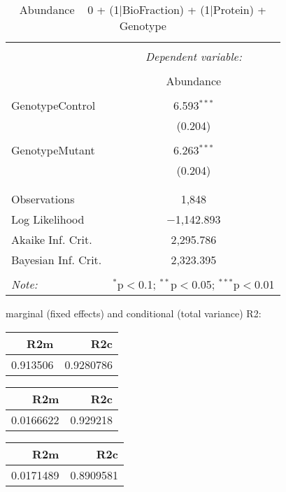 \documentclass[11pt]{report}
\begin{document}
\begin{table}[!htbp] \centering 
  \caption{Abundance ~ 0 + (1|BioFraction) + (1|Protein) + Genotype} 
  \label{} 
\begin{tabular}{@{\extracolsep{5pt}}lc} 
\\[-1.8ex]\hline 
\hline \\[-1.8ex] 
 & \multicolumn{1}{c}{\textit{Dependent variable:}} \\ 
\cline{2-2} 
\\[-1.8ex] & Abundance \\ 
\hline \\[-1.8ex] 
 GenotypeControl & 6.593$^{***}$ \\ 
  & (0.204) \\ 
  & \\ 
 GenotypeMutant & 6.263$^{***}$ \\ 
  & (0.204) \\ 
  & \\ 
\hline \\[-1.8ex] 
Observations & 1,848 \\ 
Log Likelihood & $-$1,142.893 \\ 
Akaike Inf. Crit. & 2,295.786 \\ 
Bayesian Inf. Crit. & 2,323.395 \\ 
\hline 
\hline \\[-1.8ex] 
\textit{Note:}  & \multicolumn{1}{r}{$^{*}$p$<$0.1; $^{**}$p$<$0.05; $^{***}$p$<$0.01} \\ 
\end{tabular} 
\end{table} 
marginal (fixed effects) and conditional (total variance) R2:

\begin{tabular}{r|r}
\hline
R2m & R2c\\
\hline
0.913506 & 0.9280786\\
\hline
\end{tabular}

\begin{tabular}{r|r}
\hline
R2m & R2c\\
\hline
0.0166622 & 0.929218\\
\hline
\end{tabular}

\begin{tabular}{r|r}
\hline
R2m & R2c\\
\hline
0.0171489 & 0.8909581\\
\hline
\end{tabular}
\end{document}
